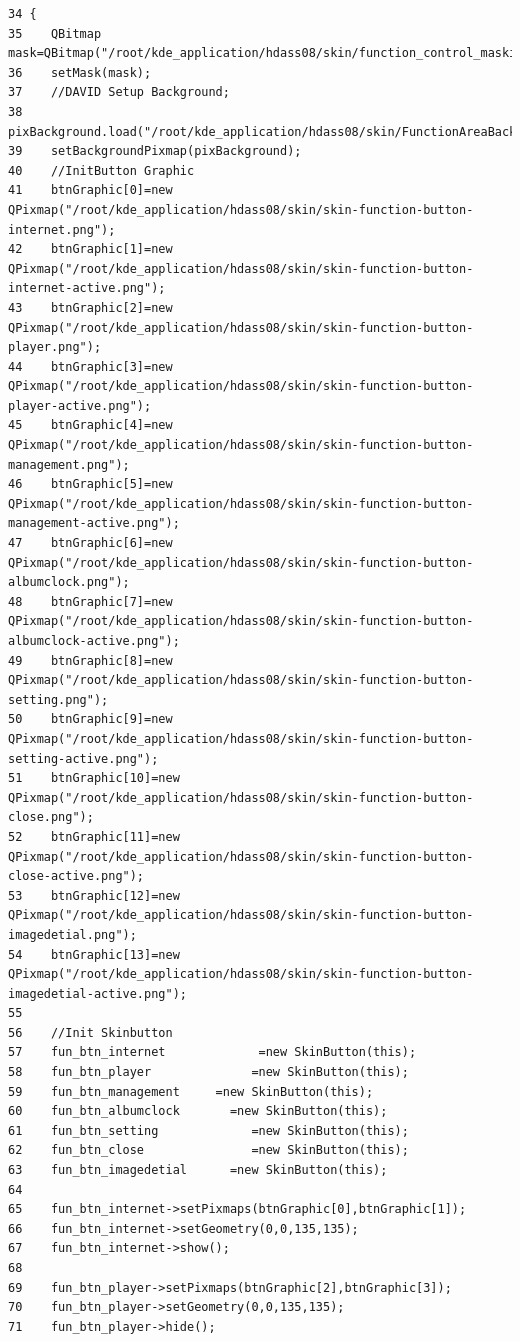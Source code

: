 \footnotesize\begin{verbatim}34 {
35    QBitmap mask=QBitmap("/root/kde_application/hdass08/skin/function_control_masking.png");
36    setMask(mask);
37    //DAVID Setup Background;
38    pixBackground.load("/root/kde_application/hdass08/skin/FunctionAreaBackground.png");
39    setBackgroundPixmap(pixBackground);
40    //InitButton Graphic
41    btnGraphic[0]=new QPixmap("/root/kde_application/hdass08/skin/skin-function-button-internet.png");
42    btnGraphic[1]=new QPixmap("/root/kde_application/hdass08/skin/skin-function-button-internet-active.png");
43    btnGraphic[2]=new QPixmap("/root/kde_application/hdass08/skin/skin-function-button-player.png");
44    btnGraphic[3]=new QPixmap("/root/kde_application/hdass08/skin/skin-function-button-player-active.png");
45    btnGraphic[4]=new QPixmap("/root/kde_application/hdass08/skin/skin-function-button-management.png");
46    btnGraphic[5]=new QPixmap("/root/kde_application/hdass08/skin/skin-function-button-management-active.png");
47    btnGraphic[6]=new QPixmap("/root/kde_application/hdass08/skin/skin-function-button-albumclock.png");
48    btnGraphic[7]=new QPixmap("/root/kde_application/hdass08/skin/skin-function-button-albumclock-active.png");
49    btnGraphic[8]=new QPixmap("/root/kde_application/hdass08/skin/skin-function-button-setting.png");
50    btnGraphic[9]=new QPixmap("/root/kde_application/hdass08/skin/skin-function-button-setting-active.png");
51    btnGraphic[10]=new QPixmap("/root/kde_application/hdass08/skin/skin-function-button-close.png");
52    btnGraphic[11]=new QPixmap("/root/kde_application/hdass08/skin/skin-function-button-close-active.png");
53    btnGraphic[12]=new QPixmap("/root/kde_application/hdass08/skin/skin-function-button-imagedetial.png");
54    btnGraphic[13]=new QPixmap("/root/kde_application/hdass08/skin/skin-function-button-imagedetial-active.png");
55    
56    //Init Skinbutton
57    fun_btn_internet             =new SkinButton(this);
58    fun_btn_player              =new SkinButton(this);
59    fun_btn_management     =new SkinButton(this);
60    fun_btn_albumclock       =new SkinButton(this);
61    fun_btn_setting             =new SkinButton(this);
62    fun_btn_close               =new SkinButton(this);
63    fun_btn_imagedetial      =new SkinButton(this);
64    
65    fun_btn_internet->setPixmaps(btnGraphic[0],btnGraphic[1]);
66    fun_btn_internet->setGeometry(0,0,135,135);
67    fun_btn_internet->show();
68    
69    fun_btn_player->setPixmaps(btnGraphic[2],btnGraphic[3]);
70    fun_btn_player->setGeometry(0,0,135,135);
71    fun_btn_player->hide();

\end{verbatim}
